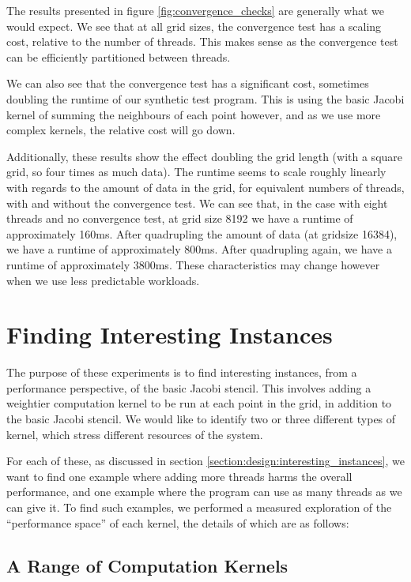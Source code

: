 The results presented in figure \ref{fig:convergence_checks} are generally what we would expect. We see that at all grid sizes, the convergence test has a scaling cost, relative to the number of threads. This makes sense as the convergence test can be efficiently partitioned between threads.

We can also see that the convergence test has a significant cost, sometimes doubling the runtime of our synthetic test program. This is using the basic Jacobi kernel of summing the neighbours of each point however, and as we use more complex kernels, the relative cost will go down.

Additionally, these results show the effect doubling the grid length (with a square grid, so four times as much data). The runtime seems to scale roughly linearly with regards to the amount of data in the grid, for equivalent numbers of threads, with and without the convergence test. We can see that, in the case with eight threads and no convergence test, at grid size 8192 we have a runtime of approximately 160ms. After quadrupling the amount of data (at gridsize 16384), we have a runtime of approximately 800ms. After quadrupling again, we have a runtime of approximately 3800ms. These characteristics may change however when we use less predictable workloads.



\section{Finding Interesting Instances}
\label{section:results:finding_interesting_instances}

The purpose of these experiments is to find interesting instances, from a performance perspective, of the basic Jacobi stencil. This involves adding a weightier computation kernel to be run at each point in the grid, in addition to the basic Jacobi stencil. We would like to identify two or three different types of kernel, which stress different resources of the system.

For each of these, as discussed in section \ref{section:design:interesting_instances}, we want to find one example where adding more threads harms the overall performance, and one example where the program can use as many threads as we can give it. To find such examples, we performed a measured exploration of the ``performance space'' of each kernel, the details of which are as follows:



\subsection{A Range of Computation Kernels}
\label{section:results:a_range_of_computation_kernels}

